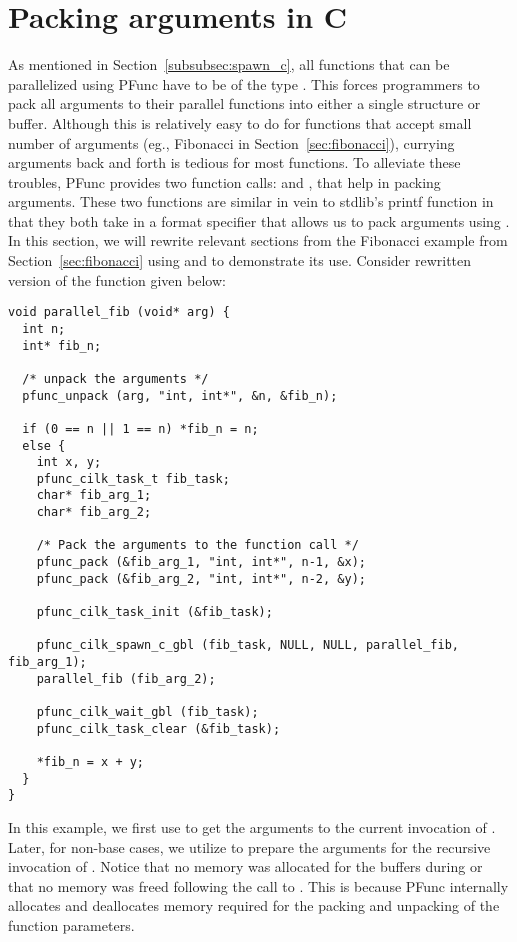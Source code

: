 \section{Packing arguments in C}
\label{sec:pack}

As mentioned in Section~\ref{subsubsec:spawn_c}, all functions that can be
parallelized using PFunc have to be of the type . This
forces programmers to pack all arguments to their parallel functions into
either a single structure or buffer. Although this is relatively easy to do for
functions that accept small number of arguments (eg., Fibonacci in
Section~\ref{sec:fibonacci}), currying arguments back and forth is tedious for
most functions. To alleviate these troubles, PFunc provides two function calls:
 and , that help in packing arguments.
These two functions are similar in vein to stdlib's printf function in that
they both take in a format specifier that allows us to pack arguments using
. In this section, we will rewrite relevant sections from the
Fibonacci example from Section~\ref{sec:fibonacci} using  and
 to demonstrate its use.  Consider rewritten version of the
function  given below:

\begin{lstlisting}
void parallel_fib (void* arg) {
  int n;
  int* fib_n;

  /* unpack the arguments */
  pfunc_unpack (arg, "int, int*", &n, &fib_n);

  if (0 == n || 1 == n) *fib_n = n;
  else {
    int x, y;
    pfunc_cilk_task_t fib_task;
    char* fib_arg_1;
    char* fib_arg_2;

    /* Pack the arguments to the function call */
    pfunc_pack (&fib_arg_1, "int, int*", n-1, &x);
    pfunc_pack (&fib_arg_2, "int, int*", n-2, &y);

    pfunc_cilk_task_init (&fib_task);

    pfunc_cilk_spawn_c_gbl (fib_task, NULL, NULL, parallel_fib, fib_arg_1);
    parallel_fib (fib_arg_2);

    pfunc_cilk_wait_gbl (fib_task);
    pfunc_cilk_task_clear (&fib_task);

    *fib_n = x + y;
  }
}
\end{lstlisting}

In this example, we first use  to get the arguments to the 
current invocation of . Later, for non-base cases, we 
utilize  to prepare the arguments for the recursive invocation
of . Notice that no memory was allocated for the buffers 
during  or that no memory was freed following the call to 
. This is because PFunc internally allocates and deallocates
memory required for the packing and unpacking of the function parameters. 


